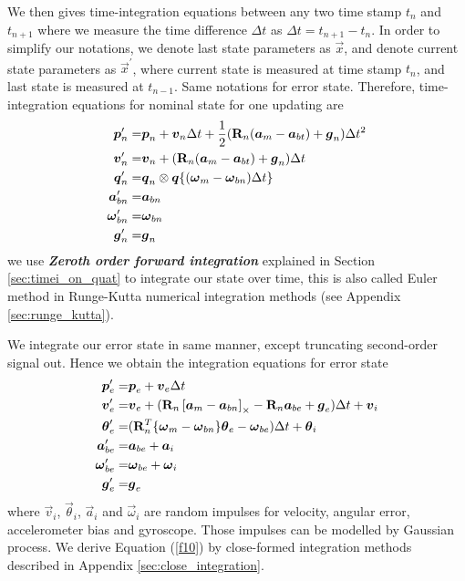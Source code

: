 We then gives time-integration equations between any two time stamp $t_n$ and $t_{n+1}$ where we measure the time difference $\Delta{t}$ as $\Delta{t} = t_{n+1} - t_{n}$. In order to simplify our notations, we denote last state parameters as $\vec{x}$, and denote current state parameters as $\vec{x}^{\prime}$, where current state is measured at time stamp $t_{n}$, and last state is measured at $t_{n-1}$. Same notations for error state. Therefore, time-integration equations for nominal state for one updating are
\begin{align}
	\boldsymbol{p}_n^{\prime} =& \boldsymbol{p}_n + \boldsymbol{v}_n\Delta{t} + \frac{1}{2}(\mathbf{R}_n(\boldsymbol{a}_m - \boldsymbol{a}_{bt}) + \boldsymbol{g}_n)\Delta{t}^2 \\
	\boldsymbol{v}_n^{\prime} =& \boldsymbol{v}_n + (\mathbf{R}_n(\boldsymbol{a}_m - \boldsymbol{a}_{bt}) + \boldsymbol{g}_n)\Delta{t}\\
	\label{f9}
	\boldsymbol{q}_n^{\prime} =& \boldsymbol{q}_n \otimes \boldsymbol{q}\{(\boldsymbol{\omega}_m - \boldsymbol{\omega}_{bn})\Delta{t}\}\\
	\boldsymbol{a}_{bn}^{\prime} =& \boldsymbol{a}_{bn} \\
	\boldsymbol{\omega}_{bn}^{\prime} =& \boldsymbol{\omega}_{bn} \\ 
	\boldsymbol{g}_n^{\prime} =& \boldsymbol{g}_n
\end{align}
we use \textbf{\textit{Zeroth order forward integration}} explained in Section \ref{sec:timei_on_quat} to integrate our state over time, this is also called Euler method in Runge-Kutta numerical integration methods (see Appendix \ref{sec:runge_kutta}).

We integrate our error state in same manner, except truncating second-order signal out. Hence we obtain the integration equations for error state
\begin{align}
	\boldsymbol{p}_e^{\prime} =& \boldsymbol{p}_e + \boldsymbol{v}_e \Delta{t}\\
	\boldsymbol{v}_e^{\prime} =& \boldsymbol{v}_e + (\mathbf{R}_n \left[ \boldsymbol{a}_m - \boldsymbol{a}_{bn} \right]_{\times} -  \mathbf{R}_n\boldsymbol{a}_{be} + \boldsymbol{g}_e)\Delta{t} + \boldsymbol{v}_i\\
	\label{f10}
	\boldsymbol{\theta}_e^{\prime} =& (\mathbf{R}_n^T \{ \boldsymbol{\omega}_m - \boldsymbol{\omega}_{bn} \} \boldsymbol{\theta}_e - \boldsymbol{\omega}_{be})\Delta{t} + \boldsymbol{\theta}_{i}\\
	\boldsymbol{a}_{be}^{\prime} =& \boldsymbol{a}_{be} + \boldsymbol{a}_i\\
	\boldsymbol{\omega}_{be}^{\prime} =& \boldsymbol{\omega}_{be} + \boldsymbol{\omega}_i\\ 
	\boldsymbol{g}_e^{\prime} =& \boldsymbol{g}_e
\end{align}
where $\vec{v}_i$, $\vec{\theta}_{i}$, $\vec{a}_i$ and $\vec{\omega}_i$ are random impulses for velocity, angular error, accelerometer bias and gyroscope. Those impulses can be modelled by Gaussian process. We derive Equation (\ref{f10}) by close-formed integration methods described in Appendix \ref{sec:close_integration}.

